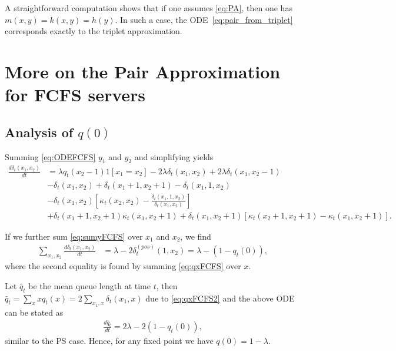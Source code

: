 \documentclass[acmsmall,nonacm]{acmart}
\begin{document}
A straightforward computation shows that if one assumes \eqref{eq:PA}, then one has $m(x,y)=k(x,y)=h(y)$. In such a case, the ODE~\eqref{eq:pair_from_triplet} corresponds exactly to the triplet approximation.

\section{More on the Pair Approximation for FCFS servers}\label{apx:moreFCFS}
\subsection{Analysis of $q(0)$}

Summing \eqref{eq:ODEFCFS} $y_1$ and $y_2$ and simplifying yields
\begin{align}\label{eq:sumyFCFS}
    \frac{d \delta_t(x_1,x_2)}{dt} &= \lambda q_t(x_2-1) 1[x_1=x_2]
    - 2\lambda \delta_t(x_1,x_2) +
    2\lambda\delta_t(x_1,x_2-1) \nonumber\\
    &-\delta_t(x_1,x_2) + \delta_t(x_1+1,x_2+1)-\delta_t(x_1,1,x_2) \nonumber \\ 
    &-\delta_t(x_1,x_2) \left[\kappa_t(x_2,x_2) - \frac{\delta_t(x_1,1,x_2)}{\delta_t(x_1,x_2)}
    \right]
    \nonumber \\ 
    &+\delta_t(x_1+1,x_2+1) \kappa_t(x_1,x_2+1)  
    +\delta_t(x_1,x_2+1) 
    \left[\kappa_t(x_2+1,x_2+1) -\kappa_t(x_1,x_2+1) \right].
    \end{align}

If we further sum \eqref{eq:sumyFCFS} over $x_1$ and $x_2$, we find
\begin{align}\label{eq:sumxyFCFS}
    \sum_{x_1,x_2} \frac{d \delta_t(x_1,x_2)}{dt} &= 
    \lambda - 2\delta_t^{(pos)}(1,x_2)= \lambda -(1-q_t(0)),
\end{align}
where the second equality is found by summing  \eqref{eq:qxFCFS} over $x$. 

Let $\bar q_t$ be the mean queue length at time $t$, then $\bar q_t = \sum_{x} x q_t(x) = 2\sum_{x_1,x}\delta_t(x_1,x)$ due to \eqref{eq:qxFCFS2}
and the above ODE can be stated as 
\begin{align}\label{eq:ODEbarqtFCFS}
     \frac{d \bar q_t}{dt}  = 2\lambda - 2(1-q_t(0)),
\end{align}
similar to the PS case.
Hence, for any fixed point we have $q(0)= 1-\lambda$.
\end{document}
